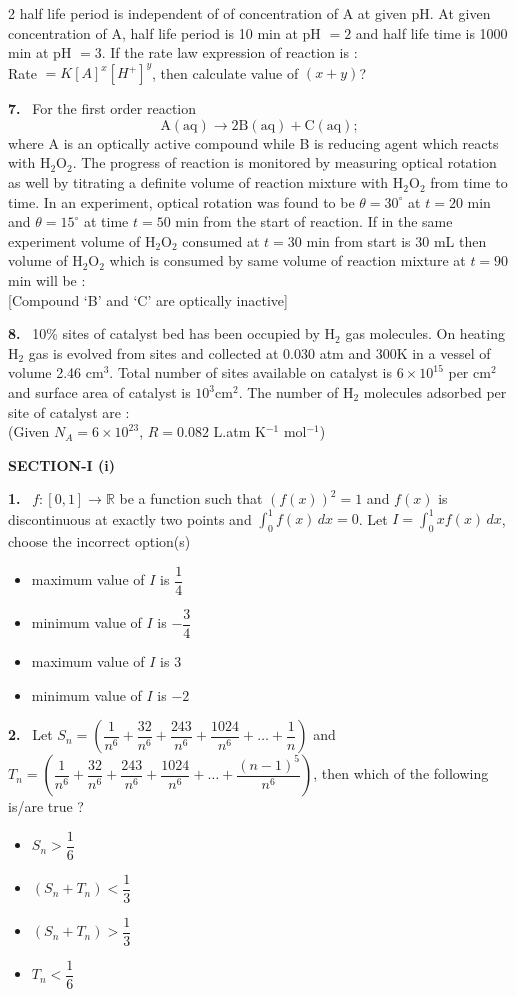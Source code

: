 \documentclass[10pt]{extarticle}
\newcommand{\partsec}[2]{\par\medskip\noindent{\large\bfseries PART-#1: #2}\par\smallskip}
\newcommand{\sect}[1]{\par\smallskip\noindent\textbf{#1}\par}
\newcommand{\qn}[1]{\par\smallskip\noindent\textbf{#1.}~}
\newenvironment{qoptions}{\begin{itemize}[leftmargin=1.8em,itemsep=1pt,topsep=2pt,label={}]}{\end{itemize}}
\newcommand{\opt}[2]{\item[(#1)] #2}
\begin{document}
\begin{multicols}{2}
half life period is independent of of concentration of A at given pH. At given concentration of A, half life period is 10 min at pH $=2$ and half life time is 1000 min at pH $=3$. If the rate law expression of reaction is :\\
Rate $=K[A]^x[H^+]^y$, then calculate value of $(x+y)$?
\qn{7} For the first order reaction
\[\mathrm{A(aq)\to 2B(aq)+C(aq)};\]
where A is an optically active compound while B is reducing agent which reacts with H$_2$O$_2$. The progress of reaction is monitored by measuring optical rotation as well by titrating a definite volume of reaction mixture with H$_2$O$_2$ from time to time. In an experiment, optical rotation was found to be $\theta=30^\circ$ at $t=20$ min and $\theta=15^\circ$ at time $t=50$ min from the start of reaction. If in the same experiment volume of H$_2$O$_2$ consumed at $t=30$ min from start is 30 mL then volume of H$_2$O$_2$ which is consumed by same volume of reaction mixture at $t=90$ min will be :\\
{[}Compound `B' and `C' are optically inactive]
\qn{8} 10\% sites of catalyst bed has been occupied by H$_2$ gas molecules. On heating H$_2$ gas is evolved from sites and collected at 0.030 atm and 300K in a vessel of volume 2.46 cm$^3$. Total number of sites available on catalyst is $6\times10^{15}$ per cm$^2$ and surface area of catalyst is $10^3$cm$^2$. The number of H$_2$ molecules adsorbed per site of catalyst are :\\
(Given $N_A=6\times10^{23}$, $R=0.082$ L.atm K$^{-1}$ mol$^{-1}$)
\partsec{3}{MATHEMATICS}
\sect{SECTION-I (i)}
\qn{1} $f:[0,1]\to\mathbb R$ be a function such that $(f(x))^2=1$ and $f(x)$ is discontinuous at exactly two points and $\displaystyle\int_0^1 f(x)\,dx=0$. Let $I=\displaystyle\int_0^1 xf(x)\,dx$, choose the incorrect option(s)
\begin{qoptions}
\opt{A}{maximum value of $I$ is $\dfrac14$}
\opt{B}{minimum value of $I$ is $-\dfrac34$}
\opt{C}{maximum value of $I$ is 3}
\opt{D}{minimum value of $I$ is $-2$}
\end{qoptions}
\qn{2} Let $S_n=\left(\dfrac1{n^6}+\dfrac{32}{n^6}+\dfrac{243}{n^6}+\dfrac{1024}{n^6}+\ldots+\dfrac1n\right)$ and $T_n=\left(\dfrac1{n^6}+\dfrac{32}{n^6}+\dfrac{243}{n^6}+\dfrac{1024}{n^6}+\ldots+\dfrac{(n-1)^5}{n^6}\right)$, then which of the following is/are true ?
\begin{qoptions}
\opt{A}{$S_n>\dfrac16$}
\opt{B}{$(S_n+T_n)<\dfrac13$}
\opt{C}{$(S_n+T_n)>\dfrac13$}
\opt{D}{$T_n<\dfrac16$}
\end{qoptions}

\end{multicols}
\end{document}
